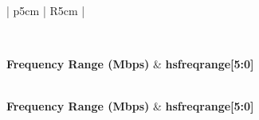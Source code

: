 \documentclass[main\_\_EN.tex]{subfiles}
\begin{document}
\begin{longtable}{| p{5cm} | R{5cm} |}
    \caption{Frequency Ranges Supported by MIPI BD D-PHY} \label{tab:mipidsi-hsfreq} \\
    \hline
    
    \textbf{Frequency Range (Mbps)} & \textbf{hsfreqrange[5:0]\tnote{*}} \\ \hline
    \endfirsthead

    \\\hline
    \textbf{Frequency Range (Mbps)} & \textbf{hsfreqrange[5:0]\tnote{*}} \\ \hline
    \endhead

     \\
    \endfoot

    \endlastfoot
    

\end{longtable}
\end{document}
